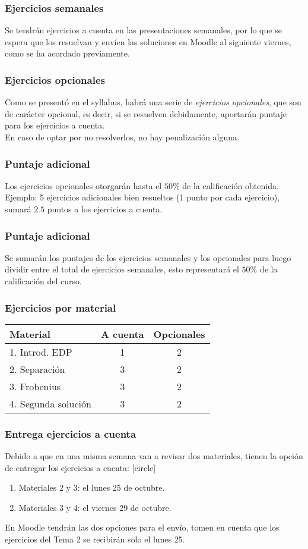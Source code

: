 \documentclass[12pt]{beamer}
\begin{document}
\begin{frame}
\frametitle{Ejercicios semanales}
Se tendrán ejercicios a cuenta en las presentaciones semanales, por lo que se espera que los resuelvan y envíen las soluciones en Moodle al siguiente viernes, como se ha acordado previamente.
\end{frame}
\begin{frame}
\frametitle{Ejercicios opcionales}
Como se presentó en el syllabus, habrá una serie de \emph{ejercicios opcionales}, que son de carácter opcional, es decir, si se resuelven debidamente, aportarán puntaje para los ejercicios a cuenta.
\\
\bigskip
\pause
En caso de optar por no resolverlos, no hay penalización alguna.
\end{frame}
\begin{frame}
\frametitle{Puntaje adicional}
Los ejercicios opcionales otorgarán hasta el $50\%$ de la calificación obtenida.
\\
\bigskip
\pause
Ejemplo: 5 ejercicios adicionales bien resueltos (1 punto por cada ejercicio), sumará $2.5$ puntos a los ejercicios a cuenta.
\end{frame}
\begin{frame}
\frametitle{Puntaje adicional}
Se sumarán los puntajes de los ejercicios semanales y los opcionales para luego dividir entre el total de ejercicios semanales, esto representará el 
$50\%$ de la calificación del curso.
\end{frame}
\begin{frame}
\frametitle{Ejercicios por material}
\begin{table}
\centering
\begin{tabular}{l c c}
Material & A cuenta & Opcionales \\ \hline
1. Introd. EDP & 1 & 2 \\ \hline
2. Separación & 3 & 2 \\ \hline
3. Frobenius & 3 & 2 \\ \hline
4. Segunda solución & 3 & 2 \\ \hline
\end{tabular}
\end{table}
\end{frame}
\begin{frame}
\frametitle{Entrega ejercicios a cuenta}
Debido a que en una misma semana van a revisar dos materiales, tienen la opción de entregar los ejercicios a cuenta:
\pause
{}
[circle]
\begin{enumerate}[<+->]
\item Materiales 2 y 3: el lunes 25 de octubre.
\item Materiales 3 y 4: el viernes 29 de octubre.
\end{enumerate}
\pause
En Moodle tendrán las dos opciones para el envío, tomen en cuenta que los ejercicios del Tema 2 se recibirán solo el lunes 25.
\end{frame}
\end{document}
